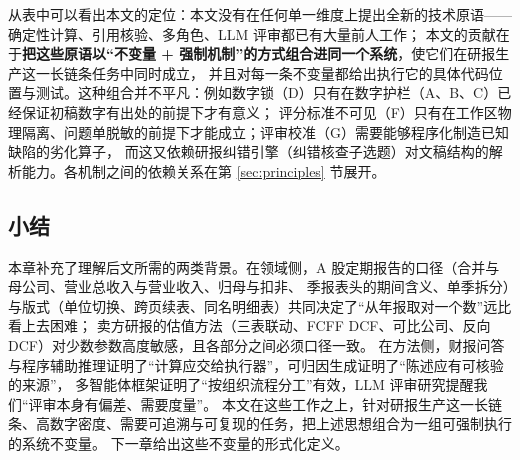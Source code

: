 从表中可以看出本文的定位：本文没有在任何单一维度上提出全新的技术原语——确定性计算、引用核验、多角色、LLM 评审都已有大量前人工作；
本文的贡献在于\textbf{把这些原语以“不变量 + 强制机制”的方式组合进同一个系统}，使它们在研报生产这一长链条任务中同时成立，
并且对每一条不变量都给出执行它的具体代码位置与测试。这种组合并不平凡：例如数字锁（D）只有在数字护栏（A、B、C）已经保证初稿数字有出处的前提下才有意义；
评分标准不可见（F）只有在工作区物理隔离、问题单脱敏的前提下才能成立；评审校准（G）需要能够程序化制造已知缺陷的劣化算子，
而这又依赖研报纠错引擎（纠错核查子选题）对文稿结构的解析能力。各机制之间的依赖关系在第 \ref{sec:principles} 节展开。

\subsection{小结}
\label{sec:rel-summary}

本章补充了理解后文所需的两类背景。在领域侧，A 股定期报告的口径（合并与母公司、营业总收入与营业收入、归母与扣非、
季报表头的期间含义、单季拆分）与版式（单位切换、跨页续表、同名明细表）共同决定了“从年报取对一个数”远比看上去困难；
卖方研报的估值方法（三表联动、FCFF DCF、可比公司、反向 DCF）对少数参数高度敏感，且各部分之间必须口径一致。
在方法侧，财报问答与程序辅助推理证明了“计算应交给执行器”，可归因生成证明了“陈述应有可核验的来源”，
多智能体框架证明了“按组织流程分工”有效，LLM 评审研究提醒我们“评审本身有偏差、需要度量”。
本文在这些工作之上，针对研报生产这一长链条、高数字密度、需要可追溯与可复现的任务，把上述思想组合为一组可强制执行的系统不变量。
下一章给出这些不变量的形式化定义。
